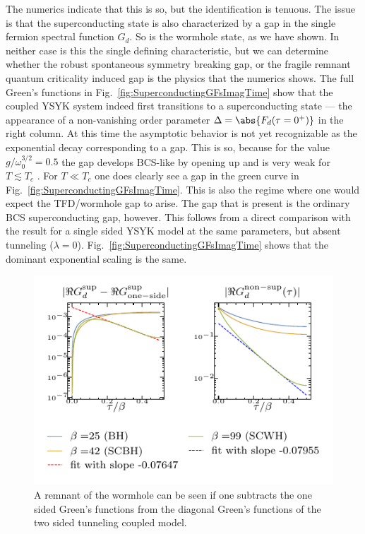 The numerics indicate that this is so, but the identification is tenuous. 
The issue is that the superconducting state is also characterized by a gap in the single fermion spectral function $G_d$. So is the wormhole state, as we have shown.
In neither case is this the single defining characteristic, but 
we can determine whether the robust spontaneous symmetry breaking gap, or the fragile remnant quantum criticality induced gap is the physics that the numerics shows.
The full Green's functions in Fig.~\ref{fig:SuperconductingGFsImagTime} show that the coupled YSYK system indeed first transitions to a superconducting state --- the appearance of a non-vanishing order parameter $\Delta = \abs{F_d(\tau=0^+)}$ %
in the right column. At this time the asymptotic behavior is not yet recognizable as the exponential decay corresponding to a gap. %
This is so, because for the value $g/\omega_0^{3/2}=0.5$ the gap develops BCS-like by opening up and is very weak for $T\lesssim T_c$ \cite{esterlis2019cooper}. For $T \ll T_c$ one does clearly see a gap in the green curve in Fig.~\ref{fig:SuperconductingGFsImagTime}. This is also the regime where one would expect the TFD/wormhole gap to arise.
The gap that is present is the ordinary BCS superconducting gap, however. This follows from a direct comparison with the result for a single sided YSYK  model at the same parameters, but absent tunneling ($\lambda=0$). Fig.~\ref{fig:SuperconductingGFsImagTime} 
shows that the dominant exponential scaling is the same. 
\begin{figure}[t]
    \centering
    \includegraphics[width=0.5\linewidth]{figures/chapter3/diffG.pdf} %
    \caption{A remnant of the wormhole can be seen if one subtracts the one sided Green's functions from the diagonal Green's functions of the two sided tunneling coupled model.}
    \label{fig:subleading-Sc}
\end{figure}

